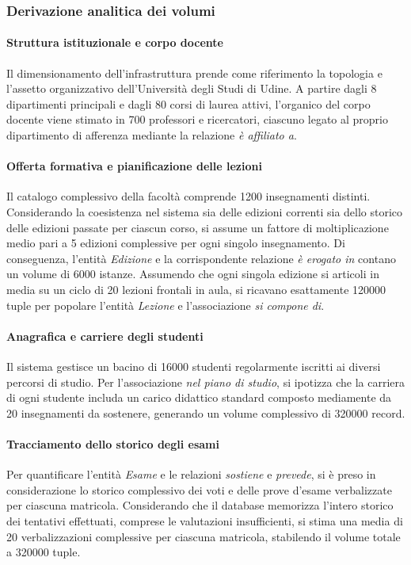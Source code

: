 \subsubsection{Derivazione analitica dei volumi}
\label{sssec:derivazione-analitica-dei-volumi}

\paragraph{Struttura istituzionale e corpo docente}
Il dimensionamento dell'infrastruttura prende come riferimento la topologia e l'assetto organizzativo dell'Università degli Studi di Udine.
A partire dagli \num{8} dipartimenti principali e dagli \num{80} corsi di laurea attivi, l'organico del corpo docente viene stimato in \num{700} professori e ricercatori, ciascuno legato al proprio dipartimento di afferenza mediante la relazione \textit{è affiliato a}.

\paragraph{Offerta formativa e pianificazione delle lezioni}
Il catalogo complessivo della facoltà comprende \num{1200} insegnamenti distinti. Considerando la coesistenza nel sistema sia delle edizioni correnti sia dello storico delle edizioni passate per ciascun corso, si assume un fattore di moltiplicazione medio pari a \num{5} edizioni complessive per ogni singolo insegnamento.
Di conseguenza, l'entità \textit{Edizione} e la corrispondente relazione \textit{è erogato in} contano un volume di \num{6000} istanze.
Assumendo che ogni singola edizione si articoli in media su un ciclo di \num{20} lezioni frontali in aula, si ricavano esattamente \num{120000} tuple per popolare l'entità \textit{Lezione} e l'associazione \textit{si compone di}.

\paragraph{Anagrafica e carriere degli studenti}
Il sistema gestisce un bacino di \num{16000} studenti regolarmente iscritti ai diversi percorsi di studio.
Per l'associazione \textit{nel piano di studio}, si ipotizza che la carriera di ogni studente includa un carico didattico standard composto mediamente da \num{20} insegnamenti da sostenere, generando un volume complessivo di \num{320000} record.

\paragraph{Tracciamento dello storico degli esami}
Per quantificare l'entità \textit{Esame} e le relazioni \textit{sostiene} e \textit{prevede}, si è preso in considerazione lo storico complessivo dei voti e delle prove d'esame verbalizzate per ciascuna matricola.
Considerando che il database memorizza l'intero storico dei tentativi effettuati, comprese le valutazioni insufficienti, si stima una media di \num{20} verbalizzazioni complessive per ciascuna matricola, stabilendo il volume totale a \num{320000} tuple.

